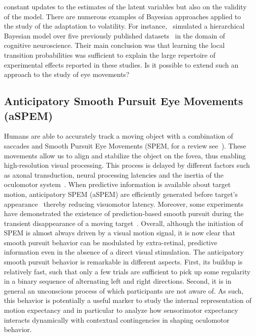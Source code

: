 \documentclass[12pt,english]{article}%
\newcommand{\citep}[1]{\parencite{#1}}
\newcommand{\citet}[1]{\textcite{#1}}
\begin{document}
constant updates to the estimates of the latent variables
but also on the validity of the model.
%
There are numerous examples of Bayesian approaches
applied to the study of the adaptation to volatility.
For instance,~\citet{Meyniel16} simulated a hierarchical Bayesian model
over five previously published datasets~\citep{Squires1976, Huettel2002, Kolossa2013, Cho2002, Falk1997} in the domain of cognitive neuroscience.
Their main conclusion was that
learning the local transition probabilities
was sufficient to explain the large repertoire
of experimental effects reported in these studies.
%
Is it possible to extend such an approach to the study of eye movements?
\subsection{Anticipatory Smooth Pursuit Eye Movements (aSPEM)}
Humans are able to accurately track a moving object
with a combination of saccades and
Smooth Pursuit Eye Movements (SPEM, for a review see~\citet{Krauzlis2008}).
These movements allow us to align and
stabilize the object on the fovea,
thus enabling high-resolution visual processing.
This process is delayed by different factors such as axonal transduction,
neural processing latencies and the inertia of the oculomotor system~\citep{Krauzlis89}.
When predictive information is available about target motion,
anticipatory SPEM (aSPEM) are
efficiently generated before target's appearance~\citep{Westheimer1954, Kowler1979a, Kowler1979b} thereby reducing visuomotor latency.
Moreover, some experiments have demonstrated the existence
of prediction-based smooth pursuit during
the transient disappearance of a moving target~\citep{Badler2006,BeckerFuchs1985}.
Overall, although the initiation of SPEM is almost always driven by a visual motion signal, it is now clear that smooth pursuit behavior
can be modulated by extra-retinal, predictive information even in the absence of a direct visual stimulation.
The anticipatory smooth pursuit behavior is remarkable
in different aspects.
First, its buildup is relatively fast, such that only a few trials are sufficient
to pick up some regularity in a binary sequence of alternating left and right directions.
Second, it is in general an unconscious process
of which participants are not aware of.
As such, this behavior is potentially a useful marker
to study the internal representation of motion expectancy %
and in particular to analyze how sensorimotor expectancy
interacts dynamically with contextual contingencies in shaping oculomotor behavior.
\end{document}

